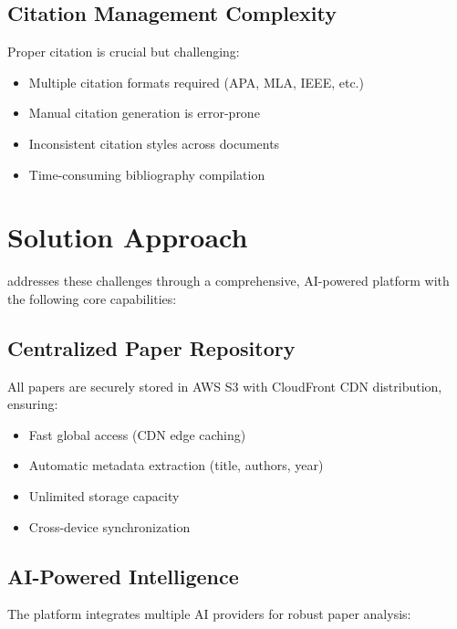 \subsection{Citation Management Complexity}

Proper citation is crucial but challenging:
\begin{itemize}[leftmargin=*]
    \item Multiple citation formats required (APA, MLA, IEEE, etc.)
    \item Manual citation generation is error-prone
    \item Inconsistent citation styles across documents
    \item Time-consuming bibliography compilation
\end{itemize}

\section{Solution Approach}
\label{sec:solution-approach}

\projectname{} addresses these challenges through a comprehensive, AI-powered platform with the following core capabilities:

\subsection{Centralized Paper Repository}

\begin{successbox}
All papers are securely stored in AWS S3 with CloudFront CDN distribution, ensuring:
\begin{itemize}
    \item Fast global access (CDN edge caching)
    \item Automatic metadata extraction (title, authors, year)
    \item Unlimited storage capacity
    \item Cross-device synchronization
\end{itemize}
\end{successbox}

\subsection{AI-Powered Intelligence}

The platform integrates multiple AI providers for robust paper analysis:


